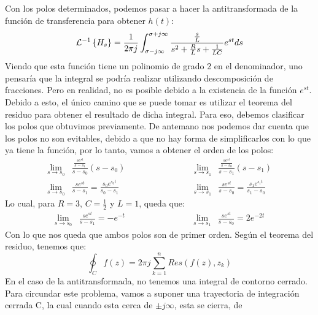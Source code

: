 \documentclass[12pt,a4paper]{report}
\begin{document}
\begin{enumerate}[label=\alph*)]
      Con los polos determinados, podemos pasar a hacer la antitransformada de la función de transferencia para obtener
      $h(t)$:
      \begin{equation*}
        \mathcal{L}^{-1}\left\{H_s\right\} = \frac{1}{2\pi j} \int_{\sigma - j\infty}^{\sigma + j\infty}
          \frac{\frac{s}{L}}{s^2 + \frac{R}{L} s + \frac{1}{LC}} e^{st} ds\\[6pt]
      \end{equation*}
      Viendo que esta función tiene un polinomio de grado 2 en el denominador, uno pensaría que la integral se podría
      realizar utilizando descomposición de fracciones. Pero en realidad, no es posible debido a la existencia de la
      función $e^{st}$. Debido a esto, el único camino que se puede tomar es utilizar el teorema del residuo para obtener
      el resultado de dicha integral. Para eso, debemos clasificar los polos que obtuvimos previamente. De antemano nos
      podemos dar cuenta que los polos no son evitables, debido a que no hay forma de simplificarlos con lo que ya tiene
      la función, por lo tanto, vamos a obtener el orden de los polos:
      \begin{align*}
        \lim_{s \to s_0}& \frac{\frac{s e^{st}}{s - s_1}}{s - s_0} (s - s_0) \hspace{3cm}
                        &\lim_{s \to s_1}& \frac{\frac{s e^{st}}{s - s_0}}{s - s_1} (s - s_1)\\[6pt]
        \lim_{s \to s_0}& \frac{s e^{st}}{s - s_1} = \frac{s_0 e^{s_0t}}{s_0 - s_1} 
                        &\lim_{s \to s_1}& \frac{s e^{st}}{s - s_0} = \frac{s_1 e^{s_1t}}{s_1 - s_0}
      \end{align*}
      Lo cual, para $R = 3$, $C = \frac{1}{2}$ y $L = 1$, queda que:
      \begin{align*}
        \lim_{s \to s_0}& \frac{s e^{st}}{s - s_1} = -e^{-t} \hspace{3cm}
                        &\lim_{s \to s_1}& \frac{s e^{st}}{s - s_0} = 2e^{-2t}
      \end{align*}
      Con lo que nos queda que ambos polos son de primer orden. Según el teorema del residuo, tenemos que:
      \begin{equation*}
        \oint_C f(z) = 2\pi j \sum_{k=1}^{n} Res(f(z), z_k)
      \end{equation*}
      En el caso de la antitransformada, no tenemos una integral de contorno cerrado. Para circundar este problema, vamos
      a suponer una trayectoria de integración cerrada C, la cual cuando esta cerca de $\pm j \infty$, esta se cierra, de

\end{enumerate}
\end{document}
